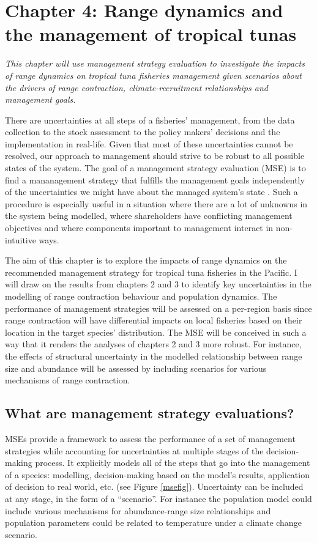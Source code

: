 \documentclass{article}
\begin{document}
\newpage
\section*{Chapter 4: Range dynamics and the management of tropical tunas}
\addtocounter{section}{1}
\setcounter{subsection}{0}
\emph{This chapter will use management strategy evaluation
  to investigate the impacts of range dynamics on tropical tuna
  fisheries management given scenarios about the drivers of range
  contraction, climate-recruitment relationships and management goals.}

There are uncertainties at all steps of a fisheries' management,
from the data collection to the stock assessment to the policy makers'
decisions and the implementation in real-life. Given that most of these
uncertainties cannot be resolved, our approach to
management should strive to be robust to all possible states of the
system. The goal of a management strategy evaluation (MSE) is to
find a mananagement strategy that fulfills the management goals
independently of the uncertainties we might have about the managed
system's state \citep{Punt2007_a}. Such a procedure is especially
useful in a situation where there are a lot of unknowns in the system
being modelled, where shareholders have conflicting management
objectives and  where components important to management
 interact in non-intuitive ways.

The aim of this chapter is to explore the impacts of range dynamics
on the recommended management strategy for tropical
tuna fisheries in the Pacific. I will draw on the results from
chapters 2 and 3 to identify key uncertainties in the modelling of range
contraction behaviour and population dynamics. The
performance of management strategies will be assessed on a per-region
basis since range contraction will have differential impacts on local fisheries
based on their location in the target species' distribution. The MSE will be conceived in such a way that it
renders the analyses of chapters 2 and 3
more robust. For instance, the effects of structural uncertainty in
the modelled relationship between range size and abundance will be
assessed by including scenarios for various mechanisms of range contraction.

\subsection{What are management strategy evaluations?}

MSEs provide a framework to assess
the performance of a set of management strategies while accounting for
uncertainties at multiple stages of the decision-making process. It
explicitly models all of the steps that go into the management of a
species: modelling, decision-making based on the model's results,
application of decision to real world, etc. (see Figure
\ref{msefig}). Uncertainty can be included
at any stage, in the form of a ``scenario''. For instance the population model could include various
mechanisms for abundance-range size relationships and population
parameters could be related to temperature under a climate change
scenario.
\end{document}
